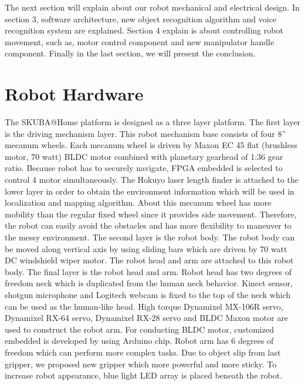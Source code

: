 \documentclass{llncs}
\begin{document}
The next section will explain about our robot mechanical and electrical design. In section 3, software architecture, new object recognition algorithm and voice recognition system are explained. Section 4 explain is about controlling robot movement, such as, motor control component and new manipulator handle component. Finally in the last section, we will present the conclusion.

\section{Robot Hardware}

The SKUBA@Home platform is designed as a three layer platform. The first layer is the driving mechanism layer. This robot mechanism base consists of four 8'' mecanum wheels. Each mecanum wheel is driven by Maxon EC 45 flat (brushless motor, 70 watt) BLDC motor combined with planetary gearhead of 1:36 gear ratio. Because robot has to securely navigate, FPGA embedded is selected to control 4 motor simultaneously. The Hokuyo laser length finder is attached to the lower layer in order to obtain the environment information which will be used in localization and mapping algorithm. About this mecanum wheel has more mobility than the regular fixed wheel since it provides side movement. Therefore, the robot can easily avoid the obstacles and has more flexibility to maneuver to the messy environment. The second layer is the robot body. The robot body can be moved along vertical axis by using sliding bars which are driven by 70 watt DC windshield wiper motor. The robot head and arm are attached to this robot body. The final layer is the robot head and arm. Robot head has two degrees of freedom neck which is duplicated from the human neck behavior. Kinect sensor, shotgun microphone and Logitech webcam is fixed to the top of the neck which can be used as the human-like head. High torque Dynamixel MX-106R servo, Dynamixel RX-64 servo, Dynamixel RX-28 servo and BLDC Maxon motor are used to construct the robot arm. For conducting BLDC motor, customized embedded is developed by using Arduino chip\cite{con_arm}. Robot arm has 6 degrees of freedom which can perform more complex tasks. Due to object slip from last gripper, we proposed new gripper which more powerful and more sticky. To increase robot appearance, blue light LED array is placed beneath the robot.
\end{document}
